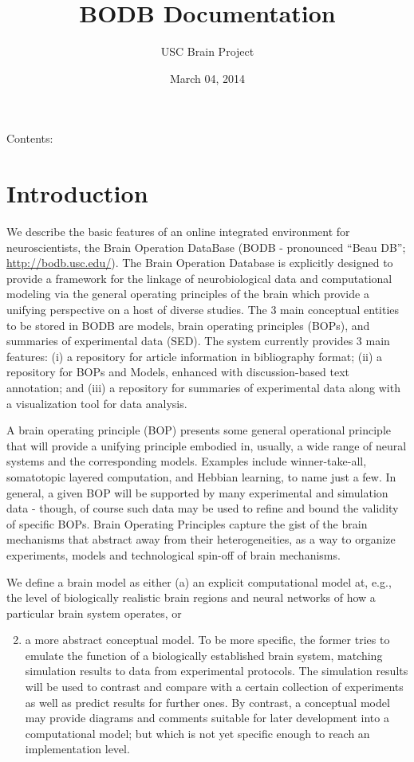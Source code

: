 \documentclass[letterpaper,10pt,english]{sphinxmanual}
\title{BODB Documentation}
\date{March 04, 2014}
\author{USC Brain Project}
\begin{document}
\maketitle
\tableofcontents
{}\label{index::doc}


Contents:


\chapter{Introduction}
\label{introduction:introduction}\label{introduction:welcome-to-bodb-s-documentation}\label{introduction::doc}
We describe the basic features of an online integrated environment for neuroscientists, the Brain Operation DataBase (BODB - pronounced “Beau DB”; \href{http://bodb.usc.edu/}{http://bodb.usc.edu/}). The Brain Operation Database is explicitly designed to provide a framework for the linkage of neurobiological data and computational modeling via the general operating principles of the brain which provide a unifying perspective on a host of diverse studies. The 3 main conceptual entities to be stored in BODB are models, brain operating principles (BOPs), and summaries of experimental data (SED). The system currently provides 3 main features: (i) a repository for article information in bibliography format; (ii) a repository for BOPs and Models, enhanced with discussion-based text annotation; and (iii) a repository for summaries of experimental data along with a visualization tool for data analysis.

A brain operating principle (BOP) presents some general operational principle that will provide a unifying principle embodied in, usually, a wide range of neural systems and the corresponding models. Examples include winner-take-all, somatotopic layered computation, and Hebbian learning, to name just a few. In general, a given BOP will be supported by many experimental and simulation data - though, of course such data may be used to refine and bound the validity of specific BOPs. Brain Operating Principles capture the gist of the brain mechanisms that abstract away from their heterogeneities, as a way to organize experiments, models and technological spin-off of brain mechanisms.

We define a brain model as either (a) an explicit computational model at, e.g., the level of biologically realistic brain regions and neural networks of how a particular brain system operates, or
\begin{enumerate}
\setcounter{enumi}{1}
\item {} 
a more abstract conceptual model. To be more specific, the former tries to emulate the function of a biologically established brain system, matching simulation results to data from experimental protocols. The simulation results will be used to contrast and compare with a certain collection of experiments as well as predict results for further ones. By contrast, a conceptual model may provide diagrams and comments suitable for later development into a computational model; but which is not yet specific enough to reach an implementation level.

\end{enumerate}
\end{document}
